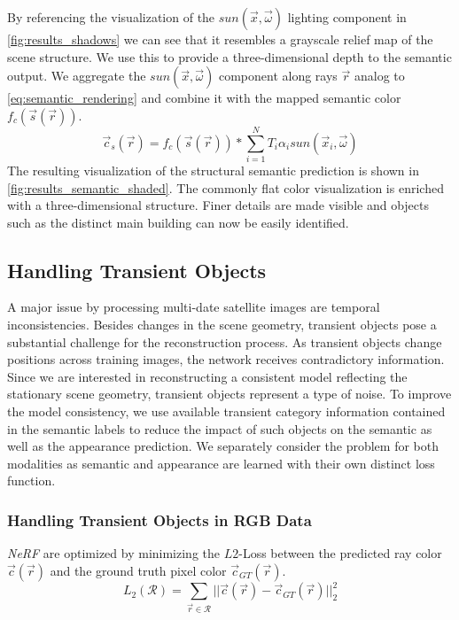 By referencing the visualization of the $sun(\vec{x}, \vec{\omega})$ lighting component in \cref{fig:results_shadows} we can see that it resembles a grayscale relief map of the scene structure.
We use this to provide a three-dimensional depth to the semantic output. We aggregate the $\mathit{sun}(\vec{x}, \vec{\omega})$ component along rays $\vec{r}$ analog to \cref{eq:semantic_rendering} and combine it with the mapped semantic color $f_c(\vec{s}(\vec{r}))$.
\begin{equation}
	\vec{c}_{s}(\vec{r}) = f_c(\vec{s}(\vec{r})) * \sum_{i=1}^{N} T_i \alpha_i \mathit{sun}(\vec{x}_i, \vec{\omega})
	\label{eq:semantic_viz_shading}
\end{equation}
The resulting visualization of the structural semantic prediction is shown in \cref{fig:results_semantic_shaded}. The commonly flat color visualization is enriched with a three-dimensional structure. Finer details are made visible and objects such as the distinct main building can now be easily identified. 


\subsection{Handling Transient Objects}
\label{subsec:handling_transients}
A major issue by processing multi-date satellite images are temporal inconsistencies. Besides changes in the scene geometry, transient objects pose a substantial challenge for the reconstruction process. As transient objects change positions across training images, the network receives contradictory information. 
Since we are interested in reconstructing a consistent model reflecting the stationary scene geometry, transient objects represent a type of noise. 
To improve the model consistency, we use available transient category information contained in the semantic labels to reduce the impact of such objects on the semantic as well as the appearance prediction. 
We separately consider the problem for both modalities as semantic and appearance are learned with their own distinct loss function.


\subsubsection{Handling Transient Objects in RGB Data}
\label{subsubsec:transients_rgb}

\emph{NeRF} are optimized by minimizing the $L2$-Loss between the predicted ray color $\vec{c}(\vec{r})$ and the ground truth pixel color $\vec{c}_{GT}(\vec{r})$.
\begin{equation}
	L_{2}(\mathcal{R}) = \sum_{\vec{r} \in \mathcal{R}}|| \vec{c}(\vec{r}) - \vec{c}_{GT}(\vec{r}) ||_2^2
	\label{eq:rgb_loss_normal}
\end{equation}


